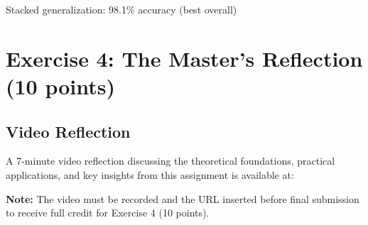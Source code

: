 \documentclass[12pt,a4paper]{article}
\theoremstyle{definition}
\begin{document}
Stacked generalization: 98.1\% accuracy (best overall)

\section{Exercise 4: The Master's Reflection (10 points)}

\subsection{Video Reflection}

A 7-minute video reflection discussing the theoretical foundations, practical applications, and key insights from this assignment is available at:

\begin{center}
\end{center}

\textbf{Note:} The video must be recorded and the URL inserted before final submission to receive full credit for Exercise 4 (10 points).
\end{document}
